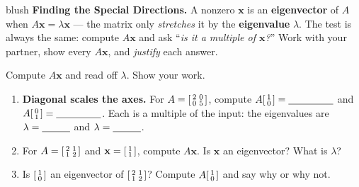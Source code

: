 \documentclass[10pt]{article}
\newcommand{\xx}{\mathbf{x}}
\begin{document}
\namepartnerperiod

\vspace{0.10in}

\begin{headlinebox}{blush}
\small\textbf{Finding the Special Directions.} A nonzero $\xx$ is an \textbf{eigenvector} of $A$ when
$A\xx=\lambda\xx$ --- the matrix only \emph{stretches} it by the \textbf{eigenvalue} $\lambda$. The
test is always the same: compute $A\xx$ and ask ``\emph{is it a multiple of $\xx$?}'' Work with your
partner, show every $A\xx$, and \emph{justify} each answer.
\end{headlinebox}

\vspace{0.10in}

\begin{tcolorbox}[colback=white, colframe=black!40, title=\textbf{Tier R --- Remediate},
    fonttitle=\bfseries, arc=1.5mm, left=3mm, right=3mm, top=2mm, bottom=2mm, breakable]
Compute $A\xx$ and read off $\lambda$. Show your work.
\begin{enumerate}[leftmargin=1.7em, itemsep=8pt]
  \item \textbf{Diagonal scales the axes.} For $A=\begin{bsmallmatrix} 2 & 0\\ 0 & 5 \end{bsmallmatrix}$,
        compute $A\begin{bsmallmatrix} 1\\ 0 \end{bsmallmatrix}=\blank{1.6cm}$ and
        $A\begin{bsmallmatrix} 0\\ 1 \end{bsmallmatrix}=\blank{1.6cm}$. Each is a multiple of the
        input: the eigenvalues are $\lambda=\blank{1.0cm}$ and $\lambda=\blank{1.0cm}$.
  \item For $A=\begin{bsmallmatrix} 2 & 1\\ 1 & 2 \end{bsmallmatrix}$ and $\xx=\begin{bsmallmatrix} 1\\ 1 \end{bsmallmatrix}$,
        compute $A\xx$. Is $\xx$ an eigenvector? What is $\lambda$? \writeline
  \item Is $\begin{bsmallmatrix} 1\\ 0 \end{bsmallmatrix}$ an eigenvector of
        $\begin{bsmallmatrix} 2 & 1\\ 1 & 2 \end{bsmallmatrix}$? Compute $A\begin{bsmallmatrix} 1\\ 0 \end{bsmallmatrix}$
        and say why or why not. \; \blank{4.0cm}
\end{enumerate}
\end{tcolorbox}
\end{document}
